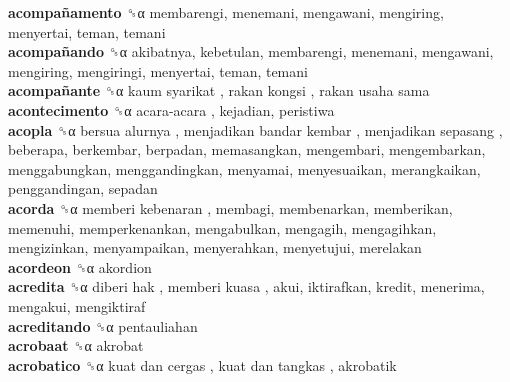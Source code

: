 \textbf{acompañamento} ␝α  membarengi, menemani, mengawani, mengiring, menyertai, teman, temani  \\
\textbf{acompañando} ␝α  akibatnya, kebetulan, membarengi, menemani, mengawani, mengiring, mengiringi, menyertai, teman, temani  \\
\textbf{acompañante} ␝α   kaum syarikat ,  rakan kongsi ,  rakan usaha sama   \\
\textbf{acontecimento} ␝α   acara-acara , kejadian, peristiwa  \\
\textbf{acopla} ␝α   bersua alurnya ,  menjadikan bandar kembar ,  menjadikan sepasang , beberapa, berkembar, berpadan, memasangkan, mengembari, mengembarkan, menggabungkan, menggandingkan, menyamai, menyesuaikan, merangkaikan, penggandingan, sepadan  \\
\textbf{acorda} ␝α   memberi kebenaran , membagi, membenarkan, memberikan, memenuhi, memperkenankan, mengabulkan, mengagih, mengagihkan, mengizinkan, menyampaikan, menyerahkan, menyetujui, merelakan  \\
\textbf{acordeon} ␝α  akordion  \\
\textbf{acredita} ␝α   diberi hak ,  memberi kuasa , akui, iktirafkan, kredit, menerima, mengakui, mengiktiraf  \\
\textbf{acreditando} ␝α  pentauliahan  \\
\textbf{acrobaat} ␝α  akrobat  \\
\textbf{acrobatico} ␝α   kuat dan cergas ,  kuat dan tangkas , akrobatik  \\
